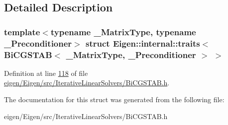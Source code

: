 \subsection{Detailed Description}
\subsubsection*{template$<$typename \+\_\+\+Matrix\+Type, typename \+\_\+\+Preconditioner$>$\newline
struct Eigen\+::internal\+::traits$<$ Bi\+C\+G\+S\+T\+A\+B$<$ \+\_\+\+Matrix\+Type, \+\_\+\+Preconditioner $>$ $>$}



Definition at line \hyperlink{eigen_2_eigen_2src_2_iterative_linear_solvers_2_bi_c_g_s_t_a_b_8h_source_l00118}{118} of file \hyperlink{eigen_2_eigen_2src_2_iterative_linear_solvers_2_bi_c_g_s_t_a_b_8h_source}{eigen/\+Eigen/src/\+Iterative\+Linear\+Solvers/\+Bi\+C\+G\+S\+T\+A\+B.\+h}.



The documentation for this struct was generated from the following file\+:\begin{DoxyCompactItemize}
\item 
eigen/\+Eigen/src/\+Iterative\+Linear\+Solvers/\+Bi\+C\+G\+S\+T\+A\+B.\+h\end{DoxyCompactItemize}
